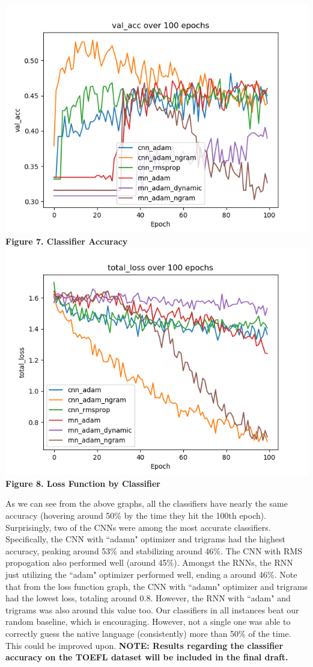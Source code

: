 \documentclass[12pt]{article}
\newcommand\tab[1][1cm]{\hspace*{#1}}
\begin{document}
\begin{center}
	\includegraphics[scale=0.74]{val_acc}\\
	\textbf{Figure 7. Classifier Accuracy}
	\includegraphics[scale=0.74]{total_loss}\\
	\textbf{Figure 8. Loss Function by Classifier}
\end{center}
\tab As we can see from the above graphs, all the classifiers have nearly the same accuracy (hovering around 50\% by the time they hit the 100th epoch). Surprisingly, two of the CNNs were among the most accurate classifiers. Specifically, the CNN with ``adamn" optimizer and trigrams had the highest accuracy, peaking around 53\% and stabilizing around 46\%. The CNN with RMS propogation also performed well (around 45\%). Amongst the RNNs, the RNN just utilizing the ``adam" optimizer performed well, ending a around 46\%. Note that from the loss function graph, the CNN with ``adamn" optimizer and trigrams had the lowest loss, totaling around 0.8. However, the RNN with ``adam" and trigrams was also around this value too. Our classifiers in all instances beat our random baseline, which is encouraging. However, not a single one was able to correctly guess the native language (consistently) more than 50\% of the time. This could be improved upon. \textbf{NOTE: Results regarding the classifier accuracy on the TOEFL dataset will be included in the final draft.}
\end{document}
